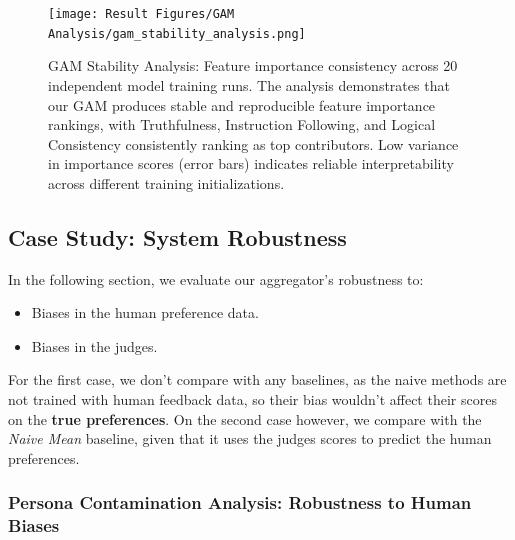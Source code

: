 
\begin{figure}[htbp]
    \centering
    \texttt{[image: Result Figures/GAM Analysis/gam\_stability\_analysis.png]}
    \caption{GAM Stability Analysis: Feature importance consistency across 20 independent model training runs. The analysis demonstrates that our GAM produces stable and reproducible feature importance rankings, with Truthfulness, Instruction Following, and Logical Consistency consistently ranking as top contributors. Low variance in importance scores (error bars) indicates reliable interpretability across different training initializations.}
    \label{fig:gam_stability}
\end{figure}

\subsection{Case Study: System Robustness}

In the following section, we evaluate our aggregator's robustness to:
\begin{itemize}
    \item Biases in the human preference data.
    \item Biases in the judges.
\end{itemize}

For the first case, we don't compare with any baselines, as the naive methods are not trained with human feedback data, so their bias wouldn't affect their scores on the \textbf{true preferences}. On the second case however, we compare with the \textit{Naive Mean} baseline, given that it uses the judges scores to predict the human preferences.


\subsubsection{Persona Contamination Analysis: Robustness to Human Biases}

